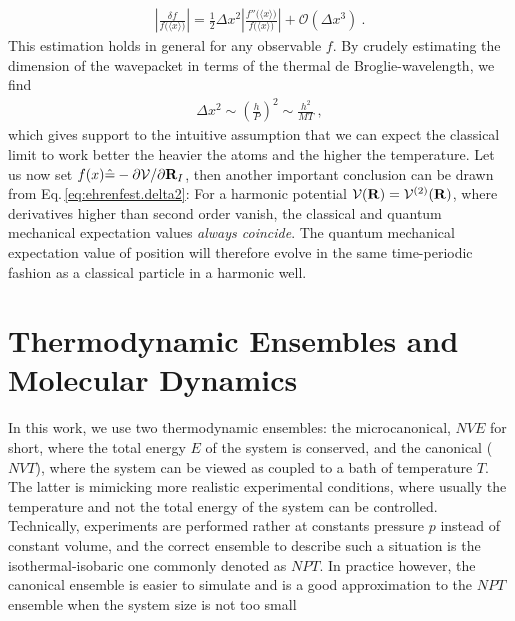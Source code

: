 \begin{align}
  \left\lvert \frac{\delta f}{f \bm ( \langle x \rangle \bm{)}} \right\rvert
  = \frac{1}{2} \Delta x^2 \left\lvert \frac{f'' \bm ( \langle x \rangle \bm{)}}{f \bm ( \langle x \rangle \bm{)}} \right\rvert
+ \mathcal{O}(\Delta x^3)~.
  \label{eq:ehrenfest.delta2}
\end{align}
This estimation holds in general for any observable $f$.
By crudely estimating the dimension of the wavepacket in terms of the thermal de Broglie-wavelength, we find
\begin{align}
  \Delta x^2 
    \sim \left( \frac{h}{P} \right)^2
    \sim \frac{h^2}{MT}~,
  \label{eq:ehrenfest:dimension}
\end{align}
which gives support to the intuitive assumption that we can expect the classical limit to work better the heavier the atoms and the higher the temperature.
Let us now set $f(x) \hat = -\partial \mathcal V / \partial {\bf R}_I$, then another important conclusion can be drawn from Eq.\,\eqref{eq:ehrenfest.delta2}: For a harmonic potential $\mathcal V ({\bf R}) = \mathcal V^{(2)} ({\bf R})$, where derivatives higher than second order vanish, the classical and quantum mechanical expectation values \emph{always coincide}. The quantum mechanical expectation value of position will therefore evolve in the same time-periodic fashion as a classical particle in a harmonic well.


\newpage

\section{Thermodynamic Ensembles and Molecular Dynamics}
In this work, we use two thermodynamic ensembles: the microcanonical, $NVE$ for short, where the total energy $E$ of the system is conserved, and the canonical ($NVT$), where the system can be viewed as coupled to a bath of temperature $T$. The latter is mimicking more realistic experimental conditions, where usually the temperature and not the total energy of the system can be controlled. Technically, experiments are performed rather at constants pressure $p$ instead of constant volume, and the correct ensemble to describe such a situation is the isothermal-isobaric one commonly denoted as $NPT$. In practice however, the canonical ensemble is easier to simulate and is a good approximation to the $NPT$ ensemble when the system size is not too small~\cite[p.\,134]{Tuckerman}

